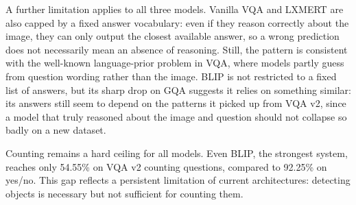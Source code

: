 A further limitation applies to all three models. Vanilla VQA and LXMERT are also capped by a fixed answer vocabulary: even if they reason correctly about the image, they can only output the closest available answer, so a wrong prediction does not necessarily mean an absence of reasoning. Still, the pattern is consistent with the well-known language-prior problem in VQA, where models partly guess from question wording rather than the image. BLIP is not restricted to a fixed list of answers, but its sharp drop on GQA suggests it relies on something similar: its answers still seem to depend on the patterns it picked up from VQA v2, since a model that truly reasoned about the image and question should not collapse so badly on a new dataset.

Counting remains a hard ceiling for all models. Even BLIP, the strongest system, reaches only 54.55\% on VQA v2 counting questions, compared to 92.25\% on yes/no. This gap reflects a persistent limitation of current architectures: detecting objects is necessary but not sufficient for counting them.
